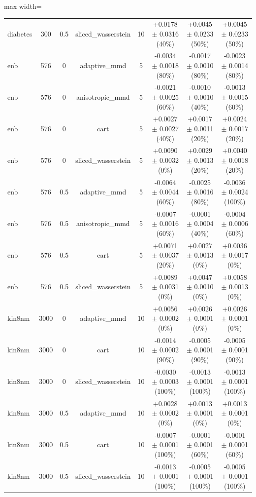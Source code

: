 \begin{table}[h]
\begin{adjustbox}{max width=\textwidth}
\begin{tabular}{lccccccc}
    diabetes & 300 & 0.5 & sliced\_wasserstein & 10 & +0.0178 $\pm$ 0.0316 (40\%) & +0.0045 $\pm$ 0.0233 (50\%) & +0.0045 $\pm$ 0.0233 (50\%) \\
    enb & 576 & 0 & adaptive\_mmd & 5 & -0.0034 $\pm$ 0.0018 (80\%) & -0.0017 $\pm$ 0.0010 (80\%) & -0.0023 $\pm$ 0.0014 (80\%) \\
    enb & 576 & 0 & anisotropic\_mmd & 5 & -0.0021 $\pm$ 0.0025 (60\%) & -0.0010 $\pm$ 0.0010 (40\%) & -0.0013 $\pm$ 0.0015 (60\%) \\
    enb & 576 & 0 & cart & 5 & +0.0027 $\pm$ 0.0027 (40\%) & +0.0017 $\pm$ 0.0011 (20\%) & +0.0024 $\pm$ 0.0017 (20\%) \\
    enb & 576 & 0 & sliced\_wasserstein & 5 & +0.0090 $\pm$ 0.0032 (0\%) & +0.0029 $\pm$ 0.0013 (20\%) & +0.0040 $\pm$ 0.0018 (20\%) \\
    enb & 576 & 0.5 & adaptive\_mmd & 5 & -0.0064 $\pm$ 0.0044 (60\%) & -0.0025 $\pm$ 0.0016 (80\%) & -0.0036 $\pm$ 0.0024 (100\%) \\
    enb & 576 & 0.5 & anisotropic\_mmd & 5 & -0.0007 $\pm$ 0.0016 (60\%) & -0.0001 $\pm$ 0.0004 (40\%) & -0.0004 $\pm$ 0.0006 (60\%) \\
    enb & 576 & 0.5 & cart & 5 & +0.0071 $\pm$ 0.0037 (20\%) & +0.0027 $\pm$ 0.0013 (0\%) & +0.0036 $\pm$ 0.0017 (0\%) \\
    enb & 576 & 0.5 & sliced\_wasserstein & 5 & +0.0089 $\pm$ 0.0031 (0\%) & +0.0047 $\pm$ 0.0010 (0\%) & +0.0058 $\pm$ 0.0013 (0\%) \\
    kin8nm & 3000 & 0 & adaptive\_mmd & 10 & +0.0056 $\pm$ 0.0002 (0\%) & +0.0026 $\pm$ 0.0001 (0\%) & +0.0026 $\pm$ 0.0001 (0\%) \\
    kin8nm & 3000 & 0 & cart & 10 & -0.0014 $\pm$ 0.0002 (90\%) & -0.0005 $\pm$ 0.0001 (90\%) & -0.0005 $\pm$ 0.0001 (90\%) \\
    kin8nm & 3000 & 0 & sliced\_wasserstein & 10 & -0.0030 $\pm$ 0.0003 (100\%) & -0.0013 $\pm$ 0.0001 (100\%) & -0.0013 $\pm$ 0.0001 (100\%) \\
    kin8nm & 3000 & 0.5 & adaptive\_mmd & 10 & +0.0028 $\pm$ 0.0002 (0\%) & +0.0013 $\pm$ 0.0001 (0\%) & +0.0013 $\pm$ 0.0001 (0\%) \\
    kin8nm & 3000 & 0.5 & cart & 10 & -0.0007 $\pm$ 0.0001 (100\%) & -0.0001 $\pm$ 0.0001 (60\%) & -0.0001 $\pm$ 0.0001 (60\%) \\
    kin8nm & 3000 & 0.5 & sliced\_wasserstein & 10 & -0.0013 $\pm$ 0.0001 (100\%) & -0.0005 $\pm$ 0.0001 (100\%) & -0.0005 $\pm$ 0.0001 (100\%) \\

\end{tabular}
\end{adjustbox}
\end{table}

